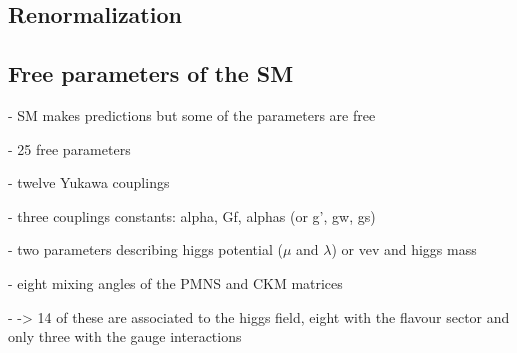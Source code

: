 \subsection{Renormalization}

\subsection{Free parameters of the SM}
- SM makes predictions but some of the parameters are free

- 25 free parameters

- twelve Yukawa couplings

- three couplings constants: alpha, Gf, alphas (or g', gw, gs)

- two parameters describing higgs potential ($\mu$ and $\lambda$) or vev and higgs mass

- eight mixing angles of the PMNS and CKM matrices


- -> 14 of these are associated to the higgs field, eight with the flavour sector and only three with the gauge interactions





